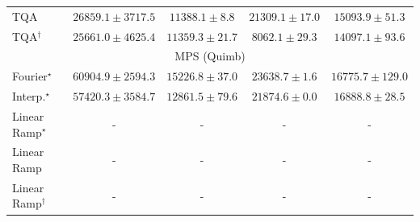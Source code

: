 \begin{tabular}{l|cccc|}
TQA & {\cellcolor[HTML]{ABC5DF}} \color[HTML]{000000} $26859.1\pm 3717.5$ & {\cellcolor[HTML]{EDF5F9}} \color[HTML]{000000} $11388.1\pm 8.8$ & {\cellcolor[HTML]{C5D8E9}} \color[HTML]{000000} $21309.1\pm 17.0$ & {\cellcolor[HTML]{E1ECF4}} \color[HTML]{000000} $15093.9\pm 51.3$ \\
TQA$^\dagger$ & {\cellcolor[HTML]{B1C9E1}} \color[HTML]{000000} $25661.0\pm 4625.4$ & {\cellcolor[HTML]{EDF5F9}} \color[HTML]{000000} $11359.3\pm 21.7$ & {\cellcolor[HTML]{F7FCFD}} \color[HTML]{000000} $8062.1\pm 29.3$ & {\cellcolor[HTML]{E4EFF6}} \color[HTML]{000000} $14097.1\pm 93.6$ \\
\cline{1-5}
\multicolumn{5}{c}{\rule{0pt}{8pt}MPS (Quimb)} \\
\midrule
Fourier$^\star$ & {\cellcolor[HTML]{892F05}} \color[HTML]{F1F1F1} $60904.9\pm 2594.3$ & {\cellcolor[HTML]{FFF7BD}} \color[HTML]{000000} $15226.8\pm 37.0$ & {\cellcolor[HTML]{FEDF88}} \color[HTML]{000000} $23638.7\pm 1.6$ & {\cellcolor[HTML]{FFF3B4}} \color[HTML]{000000} $16775.7\pm 129.0$ \\
Interp.$^\star$ & {\cellcolor[HTML]{A13804}} \color[HTML]{F1F1F1} $57420.3\pm 3584.7$ & {\cellcolor[HTML]{FFFACA}} \color[HTML]{000000} $12861.5\pm 79.6$ & {\cellcolor[HTML]{FEE595}} \color[HTML]{000000} $21874.6\pm 0.0$ & {\cellcolor[HTML]{FFF3B4}} \color[HTML]{000000} $16888.8\pm 28.5$ \\
Linear Ramp$^\star$ & {\cellcolor[HTML]{000000}} \color[HTML]{F1F1F1} {\cellcolor{white}} \color{black} - & {\cellcolor[HTML]{000000}} \color[HTML]{F1F1F1} {\cellcolor{white}} \color{black} - & {\cellcolor[HTML]{000000}} \color[HTML]{F1F1F1} {\cellcolor{white}} \color{black} - & {\cellcolor[HTML]{000000}} \color[HTML]{F1F1F1} {\cellcolor{white}} \color{black} - \\
Linear Ramp & {\cellcolor[HTML]{000000}} \color[HTML]{F1F1F1} {\cellcolor{white}} \color{black} - & {\cellcolor[HTML]{000000}} \color[HTML]{F1F1F1} {\cellcolor{white}} \color{black} - & {\cellcolor[HTML]{000000}} \color[HTML]{F1F1F1} {\cellcolor{white}} \color{black} - & {\cellcolor[HTML]{000000}} \color[HTML]{F1F1F1} {\cellcolor{white}} \color{black} - \\
Linear Ramp$^\dagger$ & {\cellcolor[HTML]{000000}} \color[HTML]{F1F1F1} {\cellcolor{white}} \color{black} - & {\cellcolor[HTML]{000000}} \color[HTML]{F1F1F1} {\cellcolor{white}} \color{black} - & {\cellcolor[HTML]{000000}} \color[HTML]{F1F1F1} {\cellcolor{white}} \color{black} - & {\cellcolor[HTML]{000000}} \color[HTML]{F1F1F1} {\cellcolor{white}} \color{black} - \\

\end{tabular}

